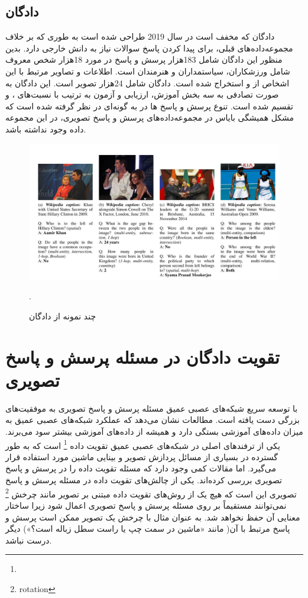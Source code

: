 \subsection{ دادگان }
	 دادگان 
	\cite{shah2019kvqa}
	 که مخفف
	است در سال 2019 طراحی شده است به طوری که بر خلاف مجموعه‌داده‌های قبلی، برای پیدا کردن پاسخ سوالات نیاز به دانش خارجی دارد. بدین منظور این دادگان شامل 183هزار پرسش و پاسخ در مورد 18هزار شخص معروف شامل ورزشکاران، سیاستمداران و هنرمندان است.  اطلاعات و تصاویر مرتبط با این  اشخاص از
	و
	استخراج شده است. دادگان
شامل 24هزار تصویر است. این ‌دادگان به صورت تصادفی به سه بخش آموزش، ارزیابی و آزمون به ترتیب با نسبت‌های
 	، 
  و
   تقسیم شده است. تنوع پرسش و پاسخ ها در 
	به گونه‌ای در نظر گرفته شده است که مشکل همیشگی بایاس در مجموعه‌داده‌های پرسش و پاسخ تصویری، در این مجموعه داده وجود نداشته باشد.
   \begin{figure}
		\centerline{\includegraphics[scale=0.4]{images/KVQA.JPG}}
		\caption[چند نمونه از ‌دادگان]{چند نمونه از ‌دادگان \cite{shah2019kvqa}}.
		\label{fig:KVQAExample}
    \end{figure}

\section{تقویت ‌دادگان در مسئله پرسش و پاسخ تصویری}
با توسعه سریع شبکه‌های عصبی عمیق مسئله پرسش و پاسخ تصویری به موفقیت‌های بزرگی دست یافته است. مطالعات نشان می‌دهد که عملکرد شبکه‌های عصبی عمیق به میزان داده‌های آموزشی بستگی دارد و همیشه از داده‌های آموزشی بیشتر سود می‌برند. یکی از ترفندهای اصلی در شبکه‌های عصبی عمیق تقویت داده
\footnote{}
 است که به طور گسترده در بسیاری از مسائل پردازش تصویر و بینایی ماشین مورد استفاده قرار می‌گیرد. اما مقالات کمی وجود دارد که مسئله تقویت داده را در پرسش و پاسخ تصویری بررسی کرده‌اند. یکی از چالش‌های تقویت داده در مسئله پرسش و پاسخ تصویری این است که هیچ یک از روش‌های تقویت داده مبتنی بر تصویر مانند چرخش
 \footnote{rotation}
  نمی‌توانند مستقیماً بر روی مسئله پرسش و پاسخ تصویری اعمال شود زیرا ساختار معنایی آن حفظ نخواهد شد. به عنوان مثال با چرخش یک تصویر ممکن است پرسش و پاسخ مرتبط با آن( مانند «ماشین در سمت چپ یا راست سطل زباله است؟») دیگر درست نباشد.
  

